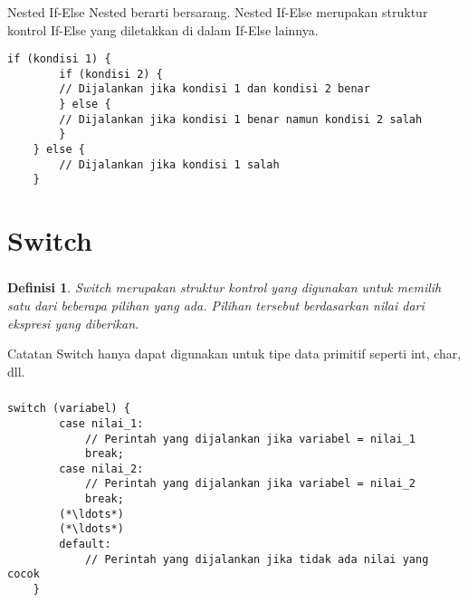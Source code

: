 \documentclass[aspectratio=169]{beamer}
\newtheorem*{definisi}{Definisi}
\theoremstyle{definition}
\begin{document}
    \begin{frame}[fragile]
        \frametitle{\insertsection}
        \begin{block}{Nested If-Else}
            Nested berarti bersarang. Nested If-Else merupakan struktur kontrol If-Else yang diletakkan di dalam If-Else lainnya.
        \end{block}
        \begin{lstlisting}[firstnumber=23,caption={Contoh Nested If-Else}]
    if (kondisi 1) {
        if (kondisi 2) {
        // Dijalankan jika kondisi 1 dan kondisi 2 benar
        } else {
        // Dijalankan jika kondisi 1 benar namun kondisi 2 salah
        }
    } else {
        // Dijalankan jika kondisi 1 salah
    }
        \end{lstlisting}
    \end{frame}

    \section{Switch}
    \begin{frame}
        \frametitle{\insertsection}
        \begin{definisi}
            Switch merupakan struktur kontrol yang digunakan untuk memilih satu dari beberapa pilihan yang ada. Pilihan tersebut berdasarkan nilai dari ekspresi yang diberikan. 
        \end{definisi}
        \begin{alertblock}{Catatan}
            Switch hanya dapat digunakan untuk tipe data primitif seperti int, char, dll.
        \end{alertblock}
    \end{frame}

    \begin{frame}[fragile]
        \frametitle{\insertsection}
        \begin{lstlisting}[firstnumber=4,caption={Struktur Switch}]
    switch (variabel) {
        case nilai_1:
            // Perintah yang dijalankan jika variabel = nilai_1
            break;
        case nilai_2:
            // Perintah yang dijalankan jika variabel = nilai_2
            break;
        (*\ldots*)
        (*\ldots*)
        default:
            // Perintah yang dijalankan jika tidak ada nilai yang cocok
    }
        \end{lstlisting}
    \end{frame}
\end{document}
